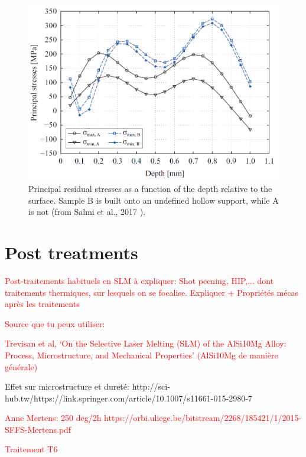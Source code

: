 \begin{figure}[ht]
	\centering
	\includegraphics[scale=0.50]{Images/Rs-support}
	\decoRule
	\caption[Principal residual stresses as a function of the depth relative to the surface. Sample B is built onto an undefined hollow support, while A is not]{Principal residual stresses as a function of the depth relative to the surface. Sample B is built onto an undefined hollow support, while A is not (from Salmi et al., 2017 \parencite{Salmi2017}).}
	\label{fig:rs_support}
\end{figure}

\section{Post treatments}
\textcolor{red}{Post-traitements habituels en SLM à expliquer: Shot peening, HIP,... dont traitements thermiques, sur lesquels on se focalise. Expliquer + Propriétés mécas après les traitements}

\textcolor{red}{Source que tu peux utiliser:}

\textcolor{red}{Trevisan et al, ‘On the Selective Laser Melting (SLM) of the AlSi10Mg Alloy: Process, Microstructure, and Mechanical Properties’ (AlSi10Mg de manière générale)}

Effet sur microstructure et dureté:
http://sci-hub.tw/https://link.springer.com/article/10.1007/s11661-015-2980-7

\textcolor{red}{Anne Mertens: 250 deg/2h
https://orbi.uliege.be/bitstream/2268/185421/1/2015-SFFS-Mertens.pdf}

\textcolor{red}{Traitement T6 \parencite{ABOULKHAIR2016139}}

